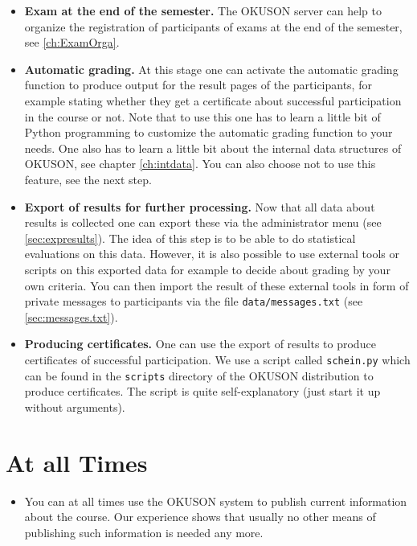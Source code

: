 \documentclass[12pt,openany,a4paper]{book}
\newcommand{\OKUSON}{\textsf{OKUSON}}
\begin{document}
\begin{itemize}
\item \textbf{Exam at the end of the semester.} The {\OKUSON} server can
help to organize the registration of participants of exams at the end of the
semester, see \ref{ch:ExamOrga}.
\item \textbf{Automatic grading.} At this stage one can activate the 
automatic grading function to produce output for the result pages of
the participants, for example stating whether they get a certificate 
about successful participation in the course or not. Note that to use
this one has to learn a little bit of Python programming to customize
the automatic grading function to your needs. One also has to learn
a little bit about the internal data structures of {\OKUSON}, see
chapter \ref{ch:intdata}. You can also choose not to use this feature,
see the next step.
\item \textbf{Export of results for further processing.} Now that all
data about results is collected one can export these via the administrator
menu (see \ref{sec:expresults}). The idea of this step is to be able to
do statistical evaluations on this data. However, it is also possible to
use external tools or scripts on this exported data for example to decide
about grading by your own criteria. You can then import the result of these
external tools in form of private messages to participants via the
file \texttt{data/messages.txt} (see \ref{sec:messages.txt}).
\item \textbf{Producing certificates.} One can use the export of results
to produce certificates of successful participation. We use a script
called \texttt{schein.py} which can be found in the \texttt{scripts}
directory of the {\OKUSON} distribution to produce certificates. The
script is quite self-explanatory (just start it up without arguments).
\end{itemize}

\section{At all Times}

\begin{itemize}
\item You can at all times use the {\OKUSON} system to publish current
information about the course. Our experience shows that usually no other
means of publishing such information is needed any more.
\end{itemize}
\end{document}
